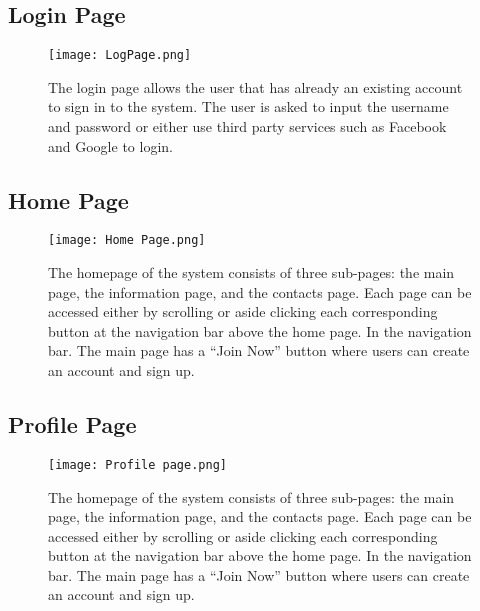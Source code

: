 \subsection{Login Page}

\begin{figure}[h]                %
	\centering                    %
	\texttt{[image: LogPage.png]}      %
	\caption{The login page allows the user that has already an existing account
		to sign in to the system. The user is asked to input the username and password
		or either use third party services such as Facebook and Google to login.}
	\label{fig:disneystock}
\end{figure}

\subsection{Home Page}

\begin{figure}[h]                %
	\centering                    %
	\texttt{[image: Home Page.png]}      %
	\caption{The homepage of the system consists of three sub-pages: the main
	page, the information page, and the contacts page. Each page can be accessed
	either by scrolling or aside clicking each corresponding button at the navigation
	bar above the home page. In the navigation bar. The main page has a “Join
	Now” button where users can create an account and sign up.}
	\label{fig:disneystock}
\end{figure}

\subsection{Profile {Page}}

\begin{figure}[h]                %
	\centering                    %
	\texttt{[image: Profile page.png]}      %
	\caption{The homepage of the system consists of three sub-pages: the main
		page, the information page, and the contacts page. Each page can be accessed
		either by scrolling or aside clicking each corresponding button at the navigation
		bar above the home page. In the navigation bar. The main page has a “Join
		Now” button where users can create an account and sign up.}
	\label{fig:disneystock}
\end{figure}





